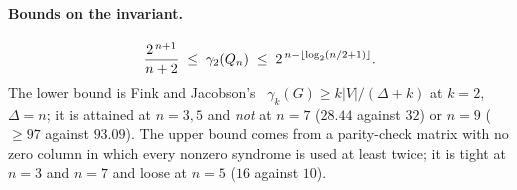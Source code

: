 \paragraph{Bounds on the invariant.}
\[
  \frac{2^{\,n+1}}{n+2} \;\le\; \gamma_2(Q_n) \;\le\; 2^{\,n - \lfloor \log_2(n/2+1)\rfloor}.
\]
The lower bound is Fink and Jacobson's~\cite{finkjacobson1985} $\gamma_k(G) \ge k|V|/(\Delta+k)$ at
$k=2$, $\Delta=n$; it is attained at $n = 3, 5$ and \emph{not} at $n = 7$
($28.44$ against $32$) or $n = 9$ ($\ge 97$ against $93.09$). The upper bound
comes from a parity-check matrix with no zero column in which every nonzero
syndrome is used at least twice; it is tight at $n = 3$ and $n = 7$ and loose at
$n = 5$ ($16$ against $10$).
